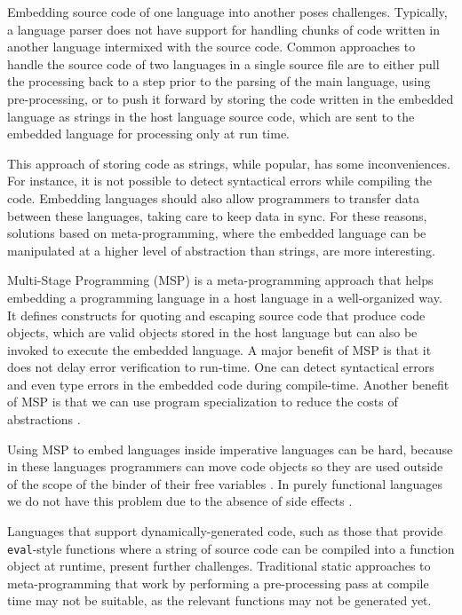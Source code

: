 \documentclass[english]{llncs}
\begin{document}
Embedding source code of one language into another poses challenges.
Typically, a language parser does not have support for handling
chunks of code written in another language intermixed with the source
code. Common approaches to handle the source code of two languages
in a single source file are to either pull the processing back to a
step prior to the parsing of the main language, using pre-processing,
or to push it forward by storing the code written in the embedded
language as strings in the host language source code, which are
sent to the embedded language for processing only at run time.

This approach of storing code as strings, while popular, has some inconveniences.
For instance, it is not possible to detect syntactical errors while compiling the code.
Embedding languages should also allow programmers to transfer data
between these languages, taking care to keep data in sync.
For these reasons, solutions based on meta-programming, where the
embedded language can be manipulated at a higher level of abstraction
than strings, are more interesting.

Multi-Stage Programming (MSP) \cite{Taha1999MSP,Taha2004gentle,Taha2008gentle}
is a meta-programming approach that helps embedding a programming language in
a host language in a well-organized way.
It defines constructs for quoting and escaping source code
that produce code objects, which are valid objects stored in the host
language but can also be invoked to execute the embedded language.
A major benefit of MSP is that it does not delay error verification to run-time.
One can detect syntactical errors and even type errors in the embedded code
during compile-time.
Another benefit of MSP is that we can use program specialization to
reduce the costs of abstractions \cite{Taha1999MSP}.

Using MSP to embed languages inside imperative languages can be hard,
because in these languages programmers can move code objects so they
are used outside of the scope of the binder of their free variables
\cite{Westbrook2010Mint}.
In purely functional languages we do not have this problem
due to the absence of side effects \cite{Kameyama2008CSS}.

Languages that support dynamically-generated code, such
as those that provide \texttt{eval}-style functions where a string
of source code can be compiled into a function object at runtime,
present further challenges. Traditional static approaches to
meta-programming that work by performing a pre-processing pass
at compile time may not be suitable, as the relevant functions
may not be generated yet.
\end{document}
